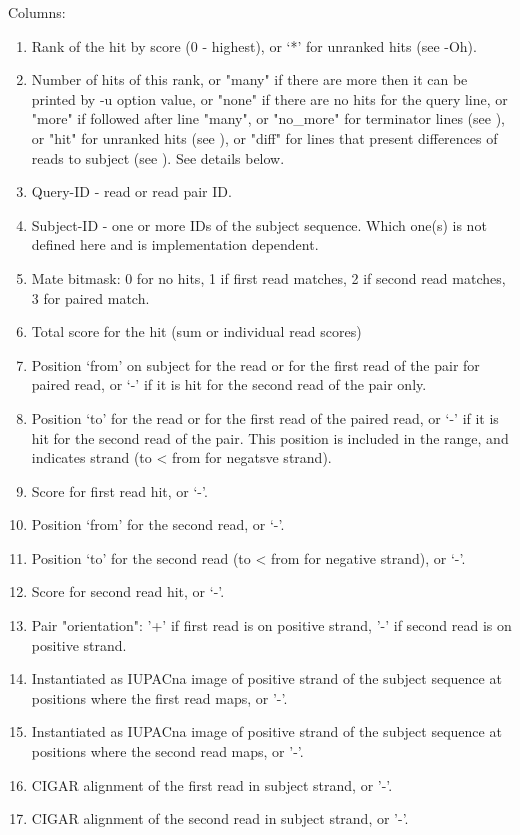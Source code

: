 \documentclass[english,letter]{article}
\begin{document}
    Columns:
\begin{enumerate}
\item   Rank of the hit by score (0 - highest), 
        or `*' for unranked hits (see -Oh).
\item Number of hits of this rank, or "many" if there are more then it
        can be printed by -u option value, or "none" if there are no hits for 
        the query line, or "more" if followed after line "many", or "no\_more"
        for terminator lines (see ), or "hit" for unranked hits (see ),
        or "diff" for lines that present differences of reads to subject 
        (see ). See details below.
\item  Query-ID - read or read pair ID.
\item  Subject-ID - one or more IDs of the subject sequence. Which one(s) is 
        not defined here and is implementation dependent.
\item  Mate bitmask: 0 for no hits, 1 if first read matches, 2 if second
        read matches, 3 for paired match.
\item  Total score for the hit (sum or individual read scores)
\item  Position `from' on subject for the read or for the first read of the 
        pair for paired read, or `-' if it is hit for the second read of the 
        pair only.
\item  Position `to' for the read or for the first read of the paired read,
        or `-' if it is hit for the second read of the pair. This position is
        included in the range, and indicates strand (to < from for negatsve 
        strand). 
\item   Score for first read hit, or `-'.
\item Position `from' for the second read, or `-'.
\item Position `to' for the second read (to < from for negative strand), 
        or `-'.
\item Score for second read hit, or `-'.
\item Pair "orientation": '+' if first read is on positive strand, '-'
        if second read is on positive strand.
\item Instantiated as IUPACna image of positive strand of the subject 
        sequence at positions where the first read maps, or '-'.
\item Instantiated as IUPACna image of positive strand of the subject 
        sequence at positions where the second read maps, or '-'.
\item CIGAR alignment of the first read in subject strand, or '-'. 
\item CIGAR alignment of the second read in subject strand, or '-'.
\end{enumerate}
\end{document}
